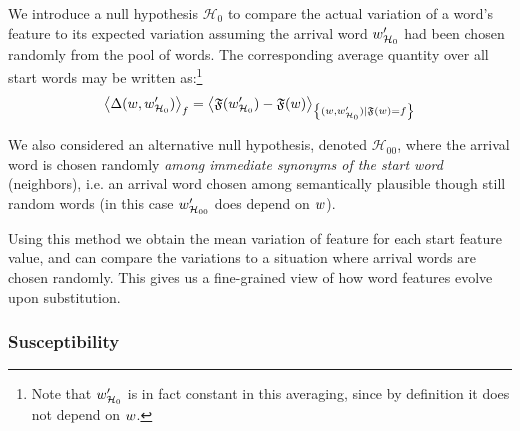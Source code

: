 We introduce a null hypothesis $\mathcal{H}_0$ to compare the actual variation of a word's feature to its expected variation assuming the arrival word $w'_{\mathcal{H}_0}$ had been chosen randomly from %
the pool of  words. The corresponding average quantity over all start words may be written as:\footnote{Note that $w'_{\mathcal{H}_0}$ is in fact constant in this averaging, since by definition it does not depend on $w$.}
$$\left< \Delta(w,w'_{\mathcal{H}_0}) \right>_f
= \left< \mathfrak{F}({w'_{\mathcal{H}_0}}) - \mathfrak{F}(w) \right>_{\left\lbrace (w,w'_{\mathcal{H}_0}) | \mathfrak{F}(w) = f \right\rbrace}$$

We also considered an alternative null hypothesis, denoted $\mathcal{H}_{00}$, where the arrival word is chosen randomly \emph{among immediate synonyms of the start word} (neighbors), i.e. an arrival word chosen among semantically plausible though still random words (in this case $w'_{\mathcal{H}_{00}}$ does depend on $w$). %

Using this method we obtain the mean variation of feature for each start feature value, and can compare the variations to a situation where arrival words are chosen randomly. This gives us a fine-grained view of how word features evolve upon substitution.


\subsubsection{Susceptibility}


